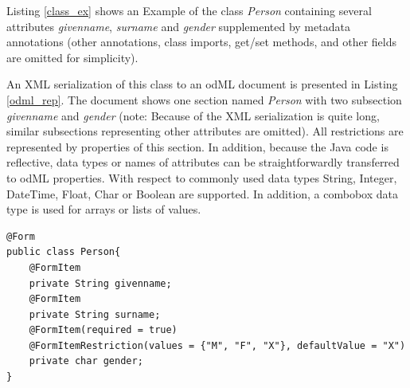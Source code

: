 \documentclass[a4paper,twoside]{article}
\begin{document}
Listing \ref{class_ex} shows an Example of the class \textit{Person} containing several attributes \textit{givenname}, \textit{surname} and \textit{gender} supplemented by metadata annotations (other annotations, class imports, get/set methods, and other fields are omitted for simplicity).

An XML serialization of this class to an odML document is presented in Listing \ref{odml_rep}. The document shows one section named \textit{Person} with two subsection \textit{givenname} and \textit{gender} (note: Because of the XML serialization is quite long, similar subsections representing other attributes are omitted). All restrictions are represented by properties of this section. In addition, because the Java code is reflective, data types or names of attributes can be straightforwardly transferred to odML properties. With respect to commonly used data types String, Integer, DateTime, Float, Char or Boolean are supported. In addition, a combobox data type is used for arrays or lists of values.


\scriptsize
\begin{lstlisting}[label=class_ex,caption=Java Class Example]
@Form
public class Person{
	@FormItem
	private String givenname;
	@FormItem
	private String surname;
	@FormItem(required = true)
	@FormItemRestriction(values = {"M", "F", "X"}, defaultValue = "X")
	private char gender;
}
\end{lstlisting}
\normalsize
\end{document}
